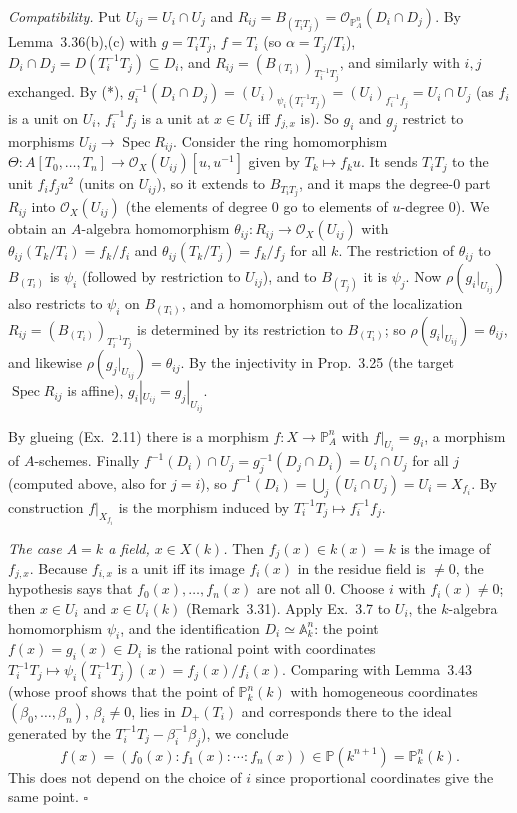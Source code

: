 \documentclass[11pt]{article}
\begin{document}
\emph{Compatibility.} Put $U_{ij}=U_i\cap U_j$ and $R_{ij}=B_{(T_iT_j)}=\mathcal{O}_{\mathbb{P}^n_A}(D_i\cap D_j)$. By Lemma~3.36(b),(c) with $g=T_iT_j$, $f=T_i$ (so $\alpha=T_j/T_i$), $D_i\cap D_j=D(T_i^{-1}T_j)\subseteq D_i$, and $R_{ij}=(B_{(T_i)})_{T_i^{-1}T_j}$, and similarly with $i,j$ exchanged. By (*), $g_i^{-1}(D_i\cap D_j)=(U_i)_{\psi_i(T_i^{-1}T_j)}=(U_i)_{f_i^{-1}f_j}=U_i\cap U_j$ (as $f_i$ is a unit on $U_i$, $f_i^{-1}f_j$ is a unit at $x\in U_i$ iff $f_{j,x}$ is). So $g_i$ and $g_j$ restrict to morphisms $U_{ij}\to\operatorname{Spec}R_{ij}$. Consider the ring homomorphism $\Theta:A[T_0,\dots,T_n]\to\mathcal{O}_X(U_{ij})[u,u^{-1}]$ given by $T_k\mapsto f_ku$. It sends $T_iT_j$ to the unit $f_if_ju^2$ (units on $U_{ij}$), so it extends to $B_{T_iT_j}$, and it maps the degree-$0$ part $R_{ij}$ into $\mathcal{O}_X(U_{ij})$ (the elements of degree $0$ go to elements of $u$-degree $0$). We obtain an $A$-algebra homomorphism $\theta_{ij}:R_{ij}\to\mathcal{O}_X(U_{ij})$ with $\theta_{ij}(T_k/T_i)=f_k/f_i$ and $\theta_{ij}(T_k/T_j)=f_k/f_j$ for all $k$. The restriction of $\theta_{ij}$ to $B_{(T_i)}$ is $\psi_i$ (followed by restriction to $U_{ij}$), and to $B_{(T_j)}$ it is $\psi_j$. Now $\rho(g_i|_{U_{ij}})$ also restricts to $\psi_i$ on $B_{(T_i)}$, and a homomorphism out of the localization $R_{ij}=(B_{(T_i)})_{T_i^{-1}T_j}$ is determined by its restriction to $B_{(T_i)}$; so $\rho(g_i|_{U_{ij}})=\theta_{ij}$, and likewise $\rho(g_j|_{U_{ij}})=\theta_{ij}$. By the injectivity in Prop.~3.25 (the target $\operatorname{Spec}R_{ij}$ is affine), $g_i|_{U_{ij}}=g_j|_{U_{ij}}$.

By glueing (Ex.~2.11) there is a morphism $f:X\to\mathbb{P}^n_A$ with $f|_{U_i}=g_i$, a morphism of $A$-schemes. Finally $f^{-1}(D_i)\cap U_j=g_j^{-1}(D_j\cap D_i)=U_i\cap U_j$ for all $j$ (computed above, also for $j=i$), so $f^{-1}(D_i)=\bigcup_j(U_i\cap U_j)=U_i=X_{f_i}$. By construction $f|_{X_{f_i}}$ is the morphism induced by $T_i^{-1}T_j\mapsto f_i^{-1}f_j$.

\emph{The case $A=k$ a field, $x\in X(k)$.} Then $f_j(x)\in k(x)=k$ is the image of $f_{j,x}$. Because $f_{i,x}$ is a unit iff its image $f_i(x)$ in the residue field is $\neq0$, the hypothesis says that $f_0(x),\dots,f_n(x)$ are not all $0$. Choose $i$ with $f_i(x)\neq0$; then $x\in U_i$ and $x\in U_i(k)$ (Remark~3.31). Apply Ex.~3.7 to $U_i$, the $k$-algebra homomorphism $\psi_i$, and the identification $D_i\simeq\mathbb{A}^n_k$: the point $f(x)=g_i(x)\in D_i$ is the rational point with coordinates $T_i^{-1}T_j\mapsto\psi_i(T_i^{-1}T_j)(x)=f_j(x)/f_i(x)$. Comparing with Lemma~3.43 (whose proof shows that the point of $\mathbb{P}^n_k(k)$ with homogeneous coordinates $(\beta_0,\dots,\beta_n)$, $\beta_i\neq0$, lies in $D_+(T_i)$ and corresponds there to the ideal generated by the $T_i^{-1}T_j-\beta_i^{-1}\beta_j$), we conclude
\[ f(x)=(f_0(x):f_1(x):\cdots:f_n(x))\in\mathbb{P}(k^{n+1})=\mathbb{P}^n_k(k). \]
This does not depend on the choice of $i$ since proportional coordinates give the same point. \hfill$\square$
\end{document}
